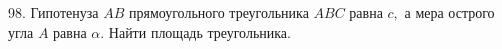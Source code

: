 98. Гипотенуза $AB$ прямоугольного треугольника $ABC$ равна $c,$ а мера острого угла $A$ равна $\alpha.$ Найти площадь треугольника.\\

